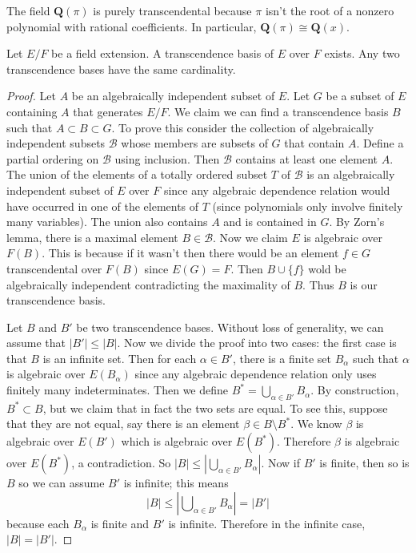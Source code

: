 \begin{example}
\label{example-pi-transcendental}
The field $\mathbf{Q}(\pi)$ is purely transcendental because
$\pi$ isn't the root of a nonzero polynomial with rational coefficients.
In particular, $\mathbf{Q}(\pi) \cong \mathbf{Q}(x)$.
\end{example}

\begin{lemma}
\label{lemma-transcendence-degree}
Let $E/F$ be a field extension. A transcendence basis of $E$ over $F$ exists.
Any two transcendence bases have the same cardinality.
\end{lemma}

\begin{proof}
Let $A$ be an algebraically independent subset of $E$. Let $G$ be a subset
of $E$ containing $A$ that generates $E/F$. We claim we can find a
transcendence basis $B$ such that $A \subset B \subset G$.
To prove this consider the collection of algebraically independent subsets
$\mathcal{B}$ whose members are subsets of $G$ that contain $A$.
Define a partial ordering on $\mathcal{B}$ using inclusion.
Then $\mathcal{B}$ contains at least one element $A$.
The union of the elements of a totally ordered subset $T$ of $\mathcal{B}$
is an algebraically independent subset of $E$ over $F$ since any algebraic
dependence relation would have occurred in one of the elements of $T$
(since polynomials only involve finitely many variables). The union also
contains $A$ and is contained in $G$. By Zorn's lemma, there is a maximal
element $B \in \mathcal{B}$. Now we claim $E$ is algebraic over $F(B)$.
This is because if it wasn't then there would be an element
$f \in G$ transcendental over $F(B)$ since $E(G) = F$. Then
$B \cup\{f\}$ wold be algebraically independent contradicting the
maximality of $B$. Thus $B$ is our transcendence basis.

\medskip\noindent
Let $B$ and $B'$ be two transcendence bases. Without loss of generality, we
can assume that $|B'| \leq |B|$. Now we divide the proof into two cases: the
first case is that $B$ is an infinite set. Then for each $\alpha \in B'$,
there is a finite set $B_{\alpha}$ such that $\alpha$ is algebraic over
$E(B_{\alpha})$ since any algebraic dependence relation only uses finitely many
indeterminates. Then we define $B^* = \bigcup_{\alpha\in B'} B_{\alpha}$.
By construction, $B^* \subset B$, but we claim that in fact the two sets are
equal. To see this, suppose that they are not equal, say there is an element
$\beta \in B \setminus B^*$. We know $\beta$ is algebraic over $E(B')$ which
is algebraic over $E(B^*)$. Therefore $\beta$ is algebraic over $E(B^*)$, a
contradiction. So $|B| \leq |\bigcup_{\alpha \in B'} B_{\alpha}|$.
Now if $B'$ is finite, then so is $B$ so we can assume $B'$ is infinite;
this means
$$
|B| \leq |\bigcup\nolimits_{\alpha \in B'} B_{\alpha}| = |B'|
$$
because each $B_\alpha$ is finite and $B'$ is infinite. Therefore in the
infinite case, $|B| = |B'|$.


\end{proof}
